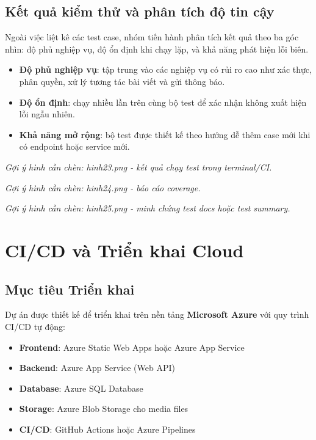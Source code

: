 \documentclass[a4paper]{article}
\begin{document}
    \subsection{Kết quả kiểm thử và phân tích độ tin cậy}
    Ngoài việc liệt kê các test case, nhóm tiến hành phân tích kết quả theo ba góc nhìn: độ phủ nghiệp vụ, độ ổn định khi chạy lặp, và khả năng phát hiện lỗi biên.
    \begin{itemize}
        \item \textbf{Độ phủ nghiệp vụ}: tập trung vào các nghiệp vụ có rủi ro cao như xác thực, phân quyền, xử lý tương tác bài viết và gửi thông báo.
        \item \textbf{Độ ổn định}: chạy nhiều lần trên cùng bộ test để xác nhận không xuất hiện lỗi ngẫu nhiên.
        \item \textbf{Khả năng mở rộng}: bộ test được thiết kế theo hướng dễ thêm case mới khi có endpoint hoặc service mới.
    \end{itemize}

    \textit{Gợi ý hình cần chèn: hinh23.png - kết quả chạy test trong terminal/CI.}

    \textit{Gợi ý hình cần chèn: hinh24.png - báo cáo coverage.}

    \textit{Gợi ý hình cần chèn: hinh25.png - minh chứng test docs hoặc test summary.}

\section{CI/CD và Triển khai Cloud}

    \subsection{Mục tiêu Triển khai}
    Dự án được thiết kế để triển khai trên nền tảng \textbf{Microsoft Azure} với quy trình CI/CD tự động:
    \begin{itemize}
        \item \textbf{Frontend}: Azure Static Web Apps hoặc Azure App Service
        \item \textbf{Backend}: Azure App Service (Web API)
        \item \textbf{Database}: Azure SQL Database
        \item \textbf{Storage}: Azure Blob Storage cho media files
        \item \textbf{CI/CD}: GitHub Actions hoặc Azure Pipelines
    \end{itemize}
\end{document}
